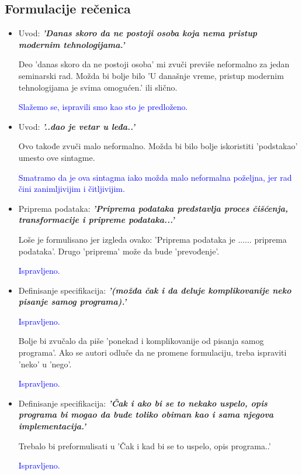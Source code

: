 \documentclass[a4paper]{report}
\newcommand{\odgovor}[1]{\textcolor{blue}{#1}}
\begin{document}
\subsection{Formulacije rečenica}
\begin{itemize}
	\item Uvod: \textbf{\textit{'Danas skoro da ne postoji osoba koja nema pristup modernim tehnologijama.'}}

	Deo 'danas skoro da ne postoji osoba' mi zvuči previše neformalno za jedan seminarski rad. Možda bi bolje bilo 'U današnje vreme, pristup modernim tehnologijama je svima omogućen.' ili slično.

	\odgovor {Slažemo se, ispravili smo kao sto je predloženo.}

	\item Uvod: \textbf{\textit{'..dao je vetar u leđa..'}}

    Ovo takođe zvuči malo neformalno. Možda bi bilo bolje iskoristiti 'podstakao' umesto ove sintagme.

	\odgovor {Smatramo da je ova sintagma iako možda malo neformalna poželjna, jer rad čini zanimljivijim i čitljivijim.}

    \item Priprema podataka: \textbf{\textit{'Priprema podataka predstavlja proces čišćenja, transformacije i pripreme podataka...'}}

    Loše je formulisano jer izgleda ovako: 'Priprema podataka je ...... priprema podataka'. Drugo 'priprema' može da bude 'prevođenje'.

    \odgovor{Ispravljeno.}

    \item Definisanje specifikacija: \textbf{\textit{'(možda čak i da deluje komplikovanije neko pisanje samog programa).'}}

    \odgovor {Ispravljeno.}

    Bolje bi zvučalo da piše 'ponekad i komplikovanije od pisanja samog programa'. Ako se autori odluče da ne promene formulaciju, treba ispraviti 'neko' u 'nego'.

    \odgovor {Ispravljeno.}

    \item Definisanje specifikacija: \textbf{\textit{'Čak i ako bi se to nekako uspelo, opis programa bi mogao da bude toliko obiman kao i sama njegova implementacija.'}}

    Trebalo bi preformulisati u 'Čak i kad bi se to uspelo, opis programa..'

    \odgovor {Ispravljeno.}


\end{itemize}
\end{document}
